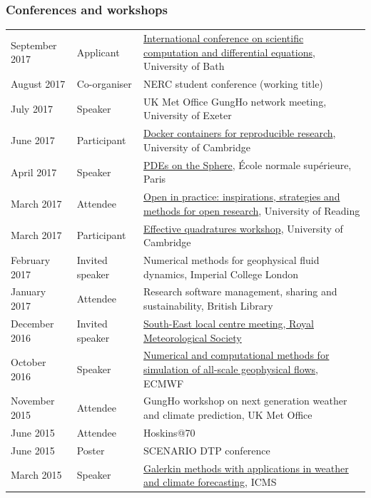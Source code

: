 \documentclass[a4paper,11pt]{article}
\begin{document}
\subsubsection*{Conferences and workshops}
\begin{tabularx}{\linewidth}{l l X}
September 2017 & Applicant & \href{https://sites.google.com/site/scicade2017/}{International conference on scientific computation and differential equations}, University of Bath \\
August 2017 & Co-organiser & NERC student conference (working title) \\
July 2017 & Speaker & UK Met Office GungHo network meeting, University of Exeter \\
June 2017 & Participant & \href{https://www.software.ac.uk/c4rr}{Docker containers for reproducible research}, University of Cambridge \\
April 2017 & Speaker & \href{https://forge.ipsl.jussieu.fr/heat/wiki/PDEs2017}{PDEs on the Sphere}, École normale supérieure, Paris \\
March 2017 & Attendee & \href{https://blogs.reading.ac.uk/open-research/open-in-practice-inspirations-strategies-and-methods-for-open-research/}{Open in practice: inspirations, strategies and methods for open research}, University of Reading \\
March 2017 & Participant & \href{http://www.effective-quadratures.org/eq2017}{Effective quadratures workshop}, University of Cambridge \\
February 2017 & Invited speaker & Numerical methods for geophysical fluid dynamics, Imperial College London \\
January 2017 & Attendee & Research software management, sharing and sustainability, British Library \\
December 2016 & Invited speaker & \href{https://www.rmets.org/events/meteorological-research-within-university-reading-2016}{South-East local centre meeting, Royal Meteorological Society} \\
October 2016 & Speaker & \href{http://www.ecmwf.int/en/learning/workshops-and-seminars/workshop-numerical-and-computational-methods-simulation-all-scale-geophysical-flows}{Numerical and computational methods for simulation of all-scale geophysical flows}, ECMWF \\
November 2015 & Attendee & GungHo workshop on next generation weather and climate prediction, UK Met Office \\
June 2015 & Attendee & Hoskins@70 \\
June 2015 & Poster & SCENARIO DTP conference \\
March 2015 & Speaker & \href{http://www.icms.org.uk/workshop.php?id=334}{Galerkin methods with applications in weather and climate forecasting}, ICMS \\
\end{tabularx}
\end{document}
